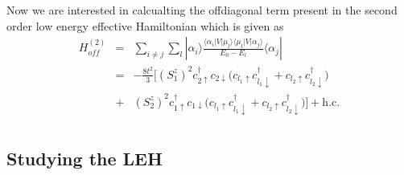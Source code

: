 \documentclass[reprint,prb,superscriptaddress]{revtex4-1}
\begin{document}
Now we are interested in calcualting the offdiagonal term present in the second order low energy effective Hamiltonian which is given as
\begin{eqnarray}
H^{(2)}_{off} &=& \sum_{i\neq j} \sum_l |\alpha_i\rangle \frac{\langle \alpha_i  | V| \mu_l \rangle \langle \mu_l  | V| \alpha_j \rangle}{E_0-E_{l}}\langle \alpha_j | \nonumber\\
&=& -\frac{8t^2}{3} \bigg[ (S_1^z)^2 c_{2\uparrow}^{\dagger}c_{2\downarrow} \bigg(  c_{l_1\uparrow}c_{l_1\downarrow}^{\dagger} +  c_{l_2\uparrow}c_{l_2\downarrow}^{\dagger} \bigg) \nonumber\\
&+& (S_2^z)^2 c_{1\uparrow}^{\dagger}c_{1\downarrow} \bigg(  c_{l_1\uparrow}c_{l_1\downarrow}^{\dagger} +  c_{l_2\uparrow}c_{l_2\downarrow}^{\dagger} \bigg)\bigg] + \textrm{h.c.} \nonumber\\
\label{eq:hamiltonian_NFL}
\end{eqnarray}
\subsection{Studying the LEH}
\end{document}
